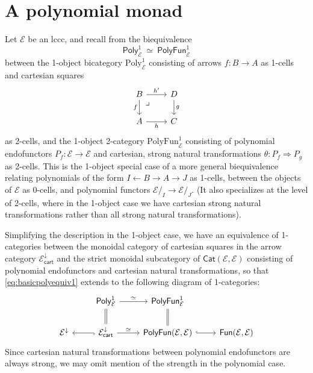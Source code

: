 \documentclass[12pt,reqno]{amsart}
\newcommand{\ednote}[1]{[\textit{\color{red}{#1}}]} %
\newcommand{\DD}{\ensuremath{\mathcal{D}}}
\newcommand{\EE}{\ensuremath{\mathcal{E}}}
\newcommand{\Cat}{\ensuremath{\mathsf{Cat}}}
\newcommand{\alg}[1]{\ensuremath{\mathsf{#1}}}
\renewcommand{\to}{\ensuremath{\rightarrow}}
\renewcommand{\t}{\ensuremath{\mathsf{t}}}
\newcommand{\pbcorner}{\arrow[dr,phantom,"\lrcorner" very near start, shift right=.5ex]} %
\theoremstyle{remark}
\theoremstyle{definition}
\begin{document}
\section{A polynomial monad}\label{sec:Monad}
%
%
%

Let $\EE$ be an lccc, and recall from \cite[Theorem 2.17]{GambinoKoch:2013} the biequivalence 
\begin{equation}\label{eq:basicpolyequiv1}
\mathsf{Poly}^1_{\EE}\ \simeq\ \mathsf{PolyFun}^1_{\EE}
\end{equation}
between the 1-object bicategory $\mathrm{Poly}^1_{\EE}$ consisting of arrows $f:B \to A$ as 1-cells and cartesian squares
\begin{equation}\label{diag:cartsquare}
\begin{tikzcd}
B \ar[d,swap, "f"] \ar[r, "{h'}"] \pbcorner & D \ar[d, "g"] \\
A \ar[r,swap, "{h}"] &  C 
\end{tikzcd}
\end{equation}
as 2-cells, and the 1-object 2-category $\mathrm{PolyFun}^1_{\EE}$ consisting of polynomial endofunctors $P_f: \EE\to \EE$ and cartesian, strong natural transformations $\theta : P_f \Rightarrow P_g$ as 2-cells.  This is the 1-object special case of a more general biequivalence relating polynomials of the form $I \leftarrow B \to A \to J$ as 1-cells, between the objects of $\EE$ as 0-cells, and polynomial functors $\EE/_I \to \EE/_J$. (It also specializes at the level of 2-cells, where in the 1-object case we have cartesian strong natural transformations rather than all strong natural transformations).  

Simplifying the description in the 1-object case, we have an equivalence of 1-categories between the monoidal category of cartesian squares in the arrow category $\EE^{\downarrow}_{\mathsf{cart}}$ and the strict monoidal subcategory of $\Cat(\EE, \EE)$ consisting of polynomial endofunctors and cartesian natural transformations, so that \eqref{eq:basicpolyequiv1} extends to the following diagram of 1-categories:
\begin{equation}\label{diagram:polyandpolyfun}
\begin{tikzcd}
& \mathsf{Poly}^1_{\EE} \ar[d,equals] \ar[r,"{\simeq}"] & \mathsf{PolyFun}^1_{\EE}  \ar[d,equals] &\\
\EE^{\downarrow}  &\EE^{\downarrow}_{\mathsf{cart}} \ar[l, hook] \ar[r,"{\simeq}"] & \mathsf{PolyFun}(\EE, \EE)  \ar[r, hook] & \mathsf{Fun}(\EE, \EE)
\end{tikzcd}
\end{equation}
Since cartesian natural transformations between polynomial endofunctors are always strong, we may omit mention of the strength in the polynomial case.
\end{document}
